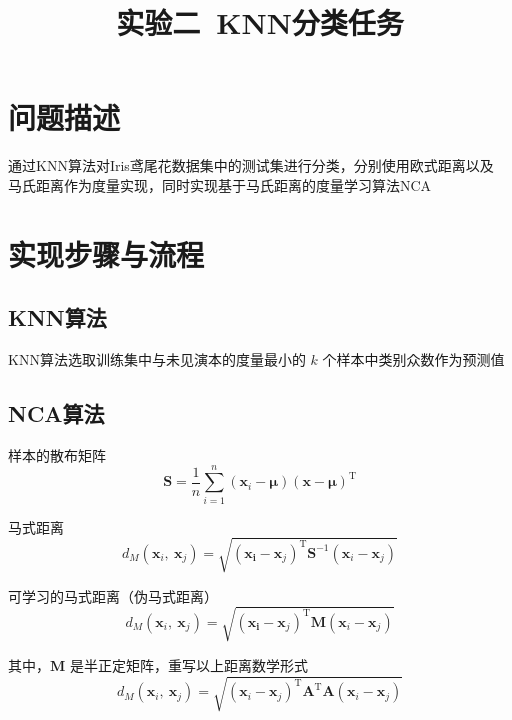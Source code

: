 \documentclass[notitlepage]{article}
\title{实验二\ KNN分类任务}
\author{}
\date{}
\begin{document}
\maketitle

\vspace{-7em}

\section{问题描述}

通过KNN算法对Iris鸢尾花数据集中的测试集进行分类，分别使用欧式距离以及
马氏距离作为度量实现，同时实现基于马氏距离的度量学习算法NCA

\section{实现步骤与流程}

\subsection*{KNN算法}

KNN算法选取训练集中与未见演本的度量最小的 $k$ 个样本中类别众数作为预测值

\subsection*{NCA算法}

样本的散布矩阵
\begin{equation*}
\mathbf{S} = \frac{1}{n} \sum_{i = 1}^{n} (\boldsymbol{x}_{i} - \boldsymbol{\mu}) 
(\boldsymbol{x} - \boldsymbol{\mu})^{\mathrm{T}}
\end{equation*}

马式距离
\begin{equation*}
d_{M}(\boldsymbol{x}_{i},\ \boldsymbol{x}_{j}) = 
\sqrt{(\boldsymbol{x_{i}} - \boldsymbol{x}_{j})^{\mathrm{T}} 
\mathbf{S}^{-1} (\boldsymbol{x}_{i} - \boldsymbol{x}_{j})}
\end{equation*}

可学习的马式距离（伪马式距离）
\begin{equation*}
d_{M}(\boldsymbol{x}_{i},\ \boldsymbol{x}_{j}) = 
\sqrt{(\boldsymbol{x_{i}} - \boldsymbol{x}_{j})^{\mathrm{T}} 
\mathbf{M} (\boldsymbol{x}_{i} - \boldsymbol{x}_{j})}
\end{equation*}

其中，$\mathbf{M}$ 是半正定矩阵，重写以上距离数学形式
\begin{equation*}
d_{M}(\boldsymbol{x}_{i},\ \boldsymbol{x}_{j}) = 
\sqrt{(\boldsymbol{x}_{i} - \boldsymbol{x}_{j})^{\mathrm{T}} 
\mathbf{A}^{\mathrm{T}} \mathbf{A} (\boldsymbol{x}_{i} - \boldsymbol{x}_{j})}
\end{equation*}
\end{document}
